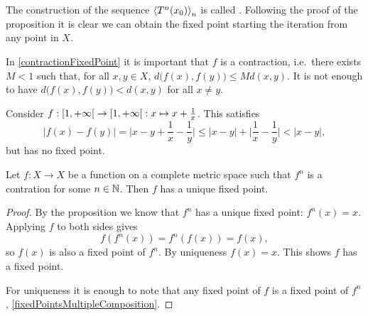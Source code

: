 The construction of the sequence $\left\langle T^n(x_0) \right\rangle_n$ is called . Following the proof of the proposition it is clear we can obtain the fixed point starting the iteration from any point in $X$.

\begin{example}
In \ref{contractionFixedPoint} it is important that $f$ is a contraction, i.e.\ there exists $M<1$ such that, for all $x,y\in X$, $d\big(f(x), f(y)\big)\leq Md(x,y)$. It is not enough to have
$d\big(f(x), f(y)\big) < d(x,y)$ for all $x\neq y$.

Consider $f: \interval[co]{1,+\infty} \to \interval[co]{1,+\infty}: x\mapsto x+ \frac{1}{x}$. This satisfies
\[ \big|f(x) - f(y) \big| = \Big|x-y + \frac{1}{x} - \frac{1}{y}\Big| \leq |x-y|+\Big|\frac{1}{x} - \frac{1}{y}\Big| < |x-y|, \]
but has no fixed point.
\end{example}

\begin{corollary}
Let $f: X\to X$ be a function on a complete metric space such that $f^n$ is a contration for some $n\in \mathbb{N}$. Then $f$ has a unique fixed point.
\end{corollary}
\begin{proof}
By the proposition we know that $f^n$ has a unique fixed point: $f^n(x) = x$. Applying $f$ to both sides gives
\[ f(f^n(x)) = f^n(f(x)) = f(x), \]
so $f(x)$ is also a fixed point of $f^n$. By uniqueness $f(x) = x$. This shows $f$ has a fixed point.

For uniqueness it is enough to note that any fixed point of $f$ is a fixed point of $f^n$, \ref{fixedPointsMultipleComposition}.
\end{proof}



